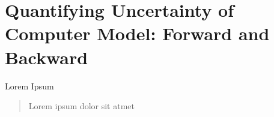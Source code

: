 \chapter[Introduction]{Quantifying Uncertainty of Computer Model: Forward and Backward}\label{ch:introduction}

Lorem Ipsum
\begin{quote}
	Lorem ipsum dolor sit atmet
\end{quote}







